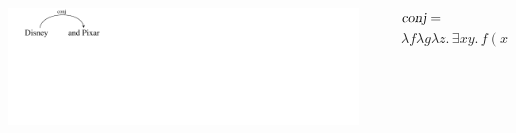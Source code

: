 \documentclass[mathserif,12pt]{beamer}
\renewcommand{\land}{\wedge}
\newcommand{\lspace}{.\,}
\begin{document}
\begin{frame}
\begin{columns}
 \end{columns}
 
 \pause
  \vspace{0.6cm}
 \begin{columns}
  \begin{column}{0.39\textwidth}
   \centering
\includegraphics[trim=1em 9em 28em 0em,clip=true,scale=1.3]{figures/conj}   
  \end{column}
  \begin{column}{0.1\textwidth}
  \end{column}
  \begin{column}{0.61\textwidth}
\large    $\textsl{conj} =$ \\ $ \lambda f \lambda g \lambda z \lspace \exists x y \lspace f(x) \land g(y) \land \mathrm{coord}(z,x,y)$ 
  \end{column}
 \end{columns}
\end{frame}
\end{document}
